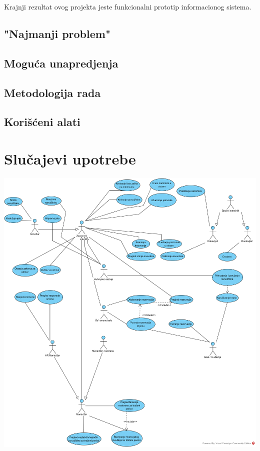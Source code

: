 \documentclass{article}
\begin{document}
Krajnji rezultat ovog projekta jeste funkcionalni prototip informacionog sistema.


\subsection{"Najmanji problem"}


\subsection{Moguća unapredjenja}


\subsection{Metodologija rada}


\subsection{Korišćeni alati}


\section{Slučajevi upotrebe}
\includegraphics[width=\textwidth]{SU_0_grupni.png}
\end{document}
